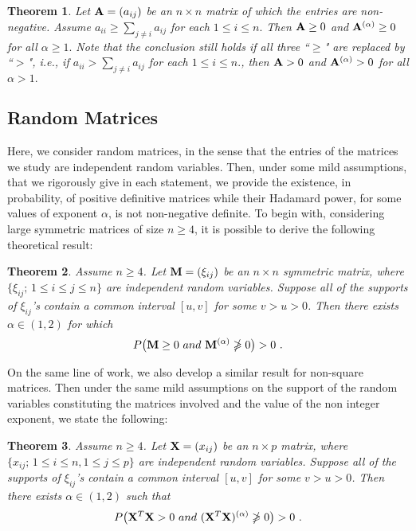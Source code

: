 \documentclass[conference,letterpaper]{IEEEtran}
\numberwithin{equation}{section}
\newcommand{\lbl}{\label}
\newcommand{\bd}{\bold}
\newcommand{\beaa}{\begin{eqnarray*}}
\newcommand{\eeaa}{\end{eqnarray*}}
\newtheorem{theorem}{{\sc Theorem}}[section]
\begin{document}
\begin{theorem}\lbl{th:th1} Let $\bd{A}=(a_{ij})$ be an $n\times n$ matrix of which the entries are non-negative. Assume $a_{ii}\geq  \sum_{j\ne i}a_{ij}$ for each $1\leq i\leq n.$ Then $\bd{A} \geq 0$ and $\bd{A}^{(\alpha)}\geq  0$ for all $\alpha\geq 1.$ 
Note that the conclusion still holds if all three ``$\geq$" are replaced by ``$>$", \textit{i.e.}, if $a_{ii} >  \sum_{j\ne i}a_{ij}$ for each $1\leq i\leq n.$, then $\bd{A} > 0$ and $\bd{A}^{(\alpha)}>  0$ for all $\alpha> 1.$ 

\end{theorem}


\subsection{Random Matrices}
Here, we consider random matrices, in the sense that the entries of the matrices we study are independent random variables.
Then, under some mild assumptions, that we rigorously give in each statement, we provide the existence, in probability, of positive definitive matrices while their Hadamard power, for some values of exponent $\alpha$, is not non-negative definite.
To begin with, considering large symmetric matrices of size $n \geq 4$, it is possible to derive the following theoretical result:
\begin{theorem}\lbl{th:th2} Assume $n\geq 4$.   Let $\bd{M}=(\xi_{ij})$ be an $n\times n$ symmetric matrix, where $\{\xi_{ij};\, 1\leq i \leq j \leq n\}$ are independent random variables. 
Suppose all of the supports of $\xi_{ij}$'s contain  a common interval $[u, v]$ for some $v>u>0$. Then there exists $\alpha \in (1, 2)$ for which
\beaa
P\big(\bd{M}\geq 0\ \mbox{and}\ \bd{M}^{(\alpha)} \ngeqslant 0\big)>0 \ .
\eeaa
\end{theorem}

On the same line of work, we also develop a similar result for non-square matrices. Then under the same mild assumptions on the support of the random variables constituting the matrices involved and the value of the non integer exponent, we state the following:
\begin{theorem}\lbl{th:th3} Assume $n\geq 4$.   Let $\bd{X}=(x_{ij})$ be an $n\times p$  matrix, where $\{x_{ij};\, 1\leq i \leq n, 1\leq j \leq p\}$ are independent random variables. Suppose all of the supports of $\xi_{ij}$'s contain  a common interval $[u, v]$ for some $v>u>0$. Then there exists $\alpha \in (1, 2)$ such that
\beaa
P\big(\bd{X}^T\bd{X}>0\ \mbox{and}\ (\bd{X}^T\bd{X})^{(\alpha)}\ngeqslant 0\big)>0 \ .
\eeaa
\end{theorem}
\end{document}
